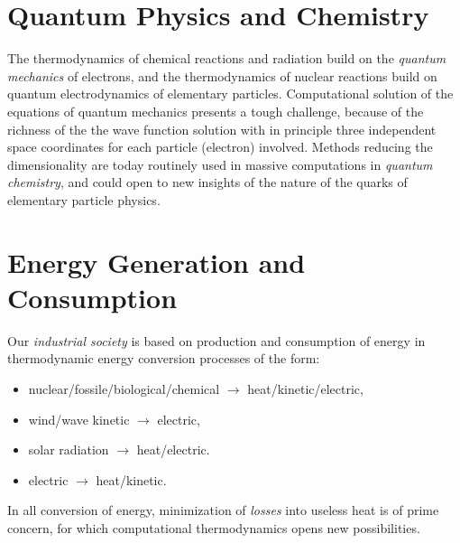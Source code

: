 



 
\section{Quantum Physics and Chemistry}

The thermodynamics of chemical reactions and radiation
build on the \emph{quantum mechanics}
of electrons, and the thermodynamics of nuclear reactions build
on quantum electrodynamics of elementary particles. Computational solution
of the equations of quantum mechanics presents a tough challenge, 
because of the richness of the the wave function solution 
with in principle three independent 
space coordinates for each particle (electron) involved. 
Methods
reducing the dimensionality are today routinely used in massive
computations in \emph{quantum chemistry}, and could open to new insights
of the nature of the quarks of elementary particle physics.

 




\section{Energy Generation and Consumption}

Our \emph{industrial society} is based on production and
consumption of energy in thermodynamic energy conversion processes of 
the form:

\begin{itemize}

\item nuclear/fossile/biological/chemical $\rightarrow$ heat/kinetic/electric, 

\item wind/wave kinetic $\rightarrow$ electric,

\item solar radiation $\rightarrow$ heat/electric.
\item electric $\rightarrow$ heat/kinetic.  
\end{itemize}
In all conversion of energy, minimization of \emph{losses} into useless heat is 
of prime concern, for which computational thermodynamics opens new
possibilities.
